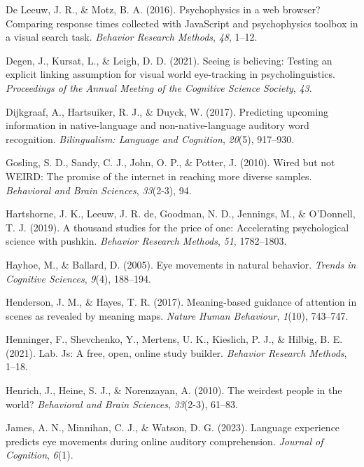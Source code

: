 \documentclass[
  man,floatsintext]{apa6}
\newlength{\cslhangindent}
\newenvironment{CSLReferences}[2] %
 {\begin{list}{}{%
  \setlength{\itemindent}{0pt}
  \setlength{\leftmargin}{0pt}
  \setlength{\parsep}{0pt}
  \ifodd #1
   \setlength{\leftmargin}{\cslhangindent}
   \setlength{\itemindent}{-1\cslhangindent}
  \fi
  \setlength{\itemsep}{#2\baselineskip}}}
 {\end{list}}
\begin{document}
\begin{CSLReferences}{1}{0}
De Leeuw, J. R., \& Motz, B. A. (2016). Psychophysics in a web browser? Comparing response times collected with JavaScript and psychophysics toolbox in a visual search task. \emph{Behavior Research Methods}, \emph{48}, 1--12.

Degen, J., Kursat, L., \& Leigh, D. D. (2021). Seeing is believing: Testing an explicit linking assumption for visual world eye-tracking in psycholinguistics. \emph{Proceedings of the Annual Meeting of the Cognitive Science Society}, \emph{43}.

Dijkgraaf, A., Hartsuiker, R. J., \& Duyck, W. (2017). Predicting upcoming information in native-language and non-native-language auditory word recognition. \emph{Bilingualism: Language and Cognition}, \emph{20}(5), 917--930.

Gosling, S. D., Sandy, C. J., John, O. P., \& Potter, J. (2010). Wired but not WEIRD: The promise of the internet in reaching more diverse samples. \emph{Behavioral and Brain Sciences}, \emph{33}(2-3), 94.

Hartshorne, J. K., Leeuw, J. R. de, Goodman, N. D., Jennings, M., \& O'Donnell, T. J. (2019). A thousand studies for the price of one: Accelerating psychological science with pushkin. \emph{Behavior Research Methods}, \emph{51}, 1782--1803.

Hayhoe, M., \& Ballard, D. (2005). Eye movements in natural behavior. \emph{Trends in Cognitive Sciences}, \emph{9}(4), 188--194.

Henderson, J. M., \& Hayes, T. R. (2017). Meaning-based guidance of attention in scenes as revealed by meaning maps. \emph{Nature Human Behaviour}, \emph{1}(10), 743--747.

Henninger, F., Shevchenko, Y., Mertens, U. K., Kieslich, P. J., \& Hilbig, B. E. (2021). Lab. Js: A free, open, online study builder. \emph{Behavior Research Methods}, 1--18.

Henrich, J., Heine, S. J., \& Norenzayan, A. (2010). The weirdest people in the world? \emph{Behavioral and Brain Sciences}, \emph{33}(2-3), 61--83.

James, A. N., Minnihan, C. J., \& Watson, D. G. (2023). Language experience predicts eye movements during online auditory comprehension. \emph{Journal of Cognition}, \emph{6}(1).


\end{CSLReferences}
\end{document}
